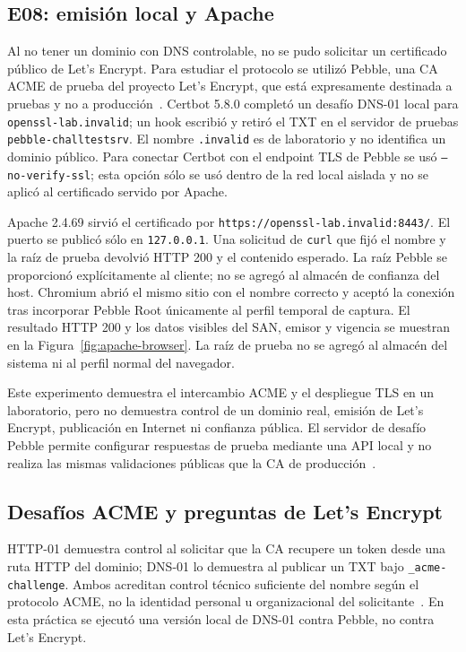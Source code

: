 \documentclass[11pt,a4paper]{article}
\begin{document}
\subsection{E08: emisión local y Apache}
Al no tener un dominio con DNS controlable, no se pudo solicitar un certificado
público de Let's Encrypt. Para estudiar el protocolo se utilizó Pebble, una CA
ACME de prueba del proyecto Let's Encrypt, que está expresamente destinada a
pruebas y no a producción~\cite{pebble}. Certbot 5.8.0 completó un desafío
DNS-01 local para \texttt{openssl-lab.invalid}; un hook escribió y retiró el
TXT en el servidor de pruebas \texttt{pebble-challtestsrv}. El nombre
\texttt{.invalid} es de laboratorio y no identifica un dominio público. Para
conectar Certbot con el endpoint TLS de Pebble se usó
\texttt{--no-verify-ssl}; esta opción sólo se usó dentro de la red local
aislada y no se aplicó al certificado servido por Apache.

Apache 2.4.69 sirvió el certificado por
\texttt{https://openssl-lab.invalid:8443/}. El puerto se publicó sólo en
\texttt{127.0.0.1}. Una solicitud de \texttt{curl} que fijó el nombre y la
raíz de prueba devolvió HTTP 200 y el contenido esperado. La raíz Pebble se
proporcionó explícitamente al cliente; no se agregó al almacén de confianza del
host. Chromium abrió el mismo sitio con el nombre correcto y aceptó la conexión
tras incorporar Pebble Root únicamente al perfil temporal de captura. El
resultado HTTP 200 y los datos visibles del SAN, emisor y vigencia se muestran
en la Figura~\ref{fig:apache-browser}. La raíz de prueba no se agregó al
almacén del sistema ni al perfil normal del navegador.

Este experimento demuestra el intercambio ACME y el despliegue TLS en un
laboratorio, pero no demuestra control de un dominio real, emisión de Let's
Encrypt, publicación en Internet ni confianza pública. El servidor de desafío
Pebble permite configurar respuestas de prueba mediante una API local y no
realiza las mismas validaciones públicas que la CA de producción~\cite{pebble}.

\subsection{Desafíos ACME y preguntas de Let's Encrypt}
HTTP-01 demuestra control al solicitar que la CA recupere un token desde una
ruta HTTP del dominio; DNS-01 lo demuestra al publicar un TXT bajo
\texttt{\_acme-challenge}. Ambos acreditan control técnico suficiente del
nombre según el protocolo ACME, no la identidad personal u organizacional del
solicitante~\cite{rfc8555}. En esta práctica se ejecutó una versión local de
DNS-01 contra Pebble, no contra Let's Encrypt.
\end{document}
